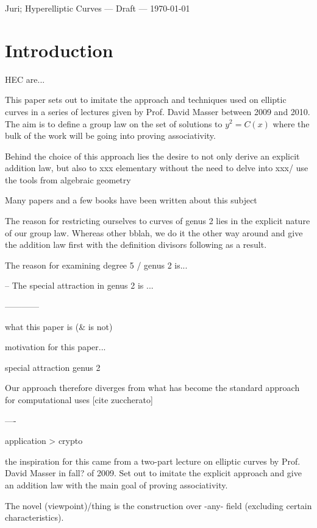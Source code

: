 \documentclass[english,11pt,a4paper]{article}
\begin{document}
\scriptsize \hfill Juri; Hyperelliptic Curves --- Draft --- \today
\normalsize

\setcounter{section}{-1}
\section{Introduction}

HEC are...

This paper sets out to imitate the approach and techniques used on elliptic curves in a series of lectures given by Prof. David Masser between 2009 and 2010. The aim is to define a group law on the set of solutions to $y^2 = C(x)$ where the bulk of the work will be going into proving associativity.

Behind the choice of this approach lies the desire to not only derive an explicit addition law, but also to xxx elementary without the need to delve into xxx/ use the tools from  algebraic geometry

Many papers and a few books have been written about this subject 

The reason for restricting ourselves to curves of genus 2 lies in the explicit nature of our group law. Whereas other bblah, we do it the other way around and give the addition law first with the definition divisors following as a result.

The reason for examining degree 5 / genus 2 is...

-- The special attraction in genus 2 is ...

------------

what this paper is (\& is not)

motivation for this paper...

special attraction genus 2

Our approach therefore diverges from what has become the standard approach for computational uses [cite zuccherato]

----


application > crypto

the inspiration for this came from a two-part lecture on elliptic curves by Prof. David Masser in fall? of 2009. Set out to imitate the explicit approach and give an addition law with the main goal of proving associativity.

The novel (viewpoint)/thing is the construction over -any- field (excluding certain characteristics).
\end{document}
